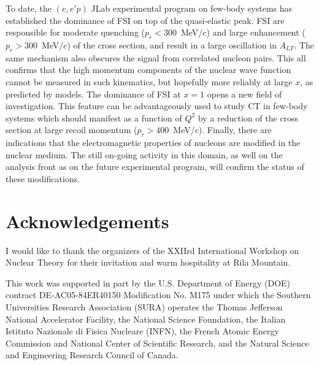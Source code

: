 \documentclass{elsart}
\begin{document}
To date, the $(e,e'p)$ JLab experimental program on few-body systems has 
established the dominance of FSI on top of the quasi-elastic peak. FSI are 
responsible for moderate quenching ($p_r < 300$~MeV/$c$) and large enhancement 
($p_r > 300$~MeV/$c$) of the cross section, and result in a large oscillation 
in $A_{LT}$. The same mechanism also obscures the signal from correlated 
nucleon pairs. This all confirms that the high momentum components of the 
nuclear wave function cannot be measured in such kinematics, but hopefully 
more reliably at large $x$, as predicted by models. \newline
The dominance of FSI at $x=1$ opens a new field of investigation. This feature 
can be advantageously used to study CT in few-body systems which should 
manifest as a function of $Q^2$ by a reduction of the cross section at large 
recoil momentum ($p_r > 400$~MeV/$c$). \newline
Finally, there are indications that the electromagnetic properties of nucleons 
are modified in the nuclear medium. The still on-going activity in this domain,
as well on the analysis front as on the future experimental program, will 
confirm the status of these modifications. 
 
%
%
\section*{Acknowledgements}

I would like to thank the organizers of the XXIIrd International Workshop on
Nuclear Theory for their invitation and warm hospitality at Rila Mountain. 

This work was supported in part by the U.S. Department of Energy (DOE) 
contract DE-AC05-84ER40150 Modification No. M175 under which the Southern 
Universities Research Association (SURA) operates the Thomas Jefferson National 
Accelerator Facility, the National Science Foundation, the Italian Istituto 
Nazionale di Fisica Nucleare (INFN), the French Atomic Energy Commission and 
National Center of Scientific Research, and the Natural Science and Engineering 
Research Council of Canada. 
\end{document}
